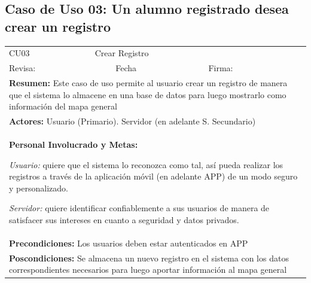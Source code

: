 
\subsection{Caso de Uso 03: Un alumno registrado desea crear un registro}

\begin{longtable}{|l|p{5.5cm}|l|p{2cm}|l|p{1.9cm}|} \hline
    \cellcolor{grisOscuro} CU03 & \multicolumn{4}{|l|}{  \cellcolor{grisOscuro} Crear Registro} &  \cellcolor{grisClaro}\multirow{2}{1cm}{} \\ \cline{1-5}
    \cellcolor{grisOscuro} Revisa: &  \cellcolor{grisClaro} &  \cellcolor{grisOscuro} Fecha &  \cellcolor{grisClaro} &  \cellcolor{grisOscuro} Firma: & \cellcolor{grisClaro} \\ \hline
    \multicolumn{6}{|p{15cm}|}{ \textbf{Resumen: } Este caso de uso permite al usuario crear un registro de manera que el sistema lo almacene en una base de datos para luego mostrarlo como información del mapa general

    } \\ \hline

    \multicolumn{6}{|p{15cm}|}{ \textbf{Actores: } Usuario (Primario). Servidor (en adelante S. Secundario)

    } \\ \hline

    \multicolumn{6}{|p{15cm}|}{ \textbf{Personal Involucrado y Metas: }

    \emph{Usuario:} quiere que el sistema lo reconozca como tal, así pueda realizar los registros a través de la aplicación móvil (en adelante APP) de un modo seguro y personalizado.

    \emph{Servidor:} quiere identificar confiablemente a sus usuarios de manera de satisfacer sus intereses en cuanto a seguridad y datos privados.

    } \\ \hline

    \multicolumn{6}{|p{15cm}|}{ \textbf{Precondiciones: } Los usuarios deben estar autenticados en APP

    } \\ \hline

    \multicolumn{6}{|p{15cm}|}{ \textbf{Poscondiciones: } Se almacena un nuevo registro en el sistema con los datos correspondientes necesarios para luego aportar información al mapa general

}
\end{longtable}
